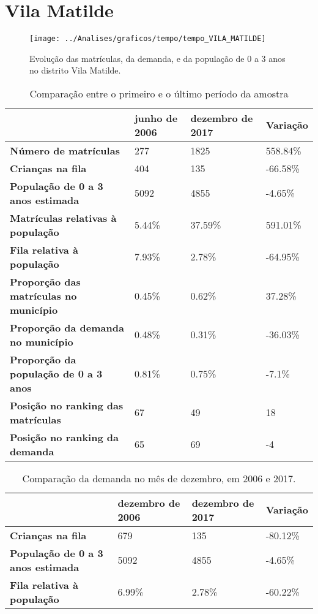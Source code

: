 \section{Vila Matilde}
\begin{figure}[H]
\centering
\texttt{[image: ../Analises/graficos/tempo/tempo\_VILA\_MATILDE]}
\caption{Evolução das matrículas, da demanda, e da população de 0 a 3 anos no distrito Vila Matilde.}
\end{figure}
\begin{table}[H]
\begin{tabular}{|l|l|l|l|}
\hline
\textbf{}                                      & \textbf{junho de 2006}       & \textbf{dezembro de 2017}    & \textbf{Variação} \\ \hline
\textbf{Número de matrículas}                  & 277 & 1825 & 558.84\% \\ \hline
\textbf{Crianças na fila}                      & 404 & 135 & -66.58\% \\ \hline
\textbf{População de 0 a 3 anos estimada}      & 5092 & 4855 & -4.65\% \\ \hline
\textbf{Matrículas relativas à população}      & 5.44\% & 37.59\% & 591.01\% \\ \hline
\textbf{Fila relativa à população}             & 7.93\% & 2.78\% & -64.95\% \\ \hline
\textbf{Proporção das matrículas no município} & 0.45\% & 0.62\% & 37.28\% \\ \hline
\textbf{Proporção da demanda no município}     & 0.48\% & 0.31\% & -36.03\% \\ \hline
\textbf{Proporção da população de 0 a 3 anos}  & 0.81\% & 0.75\% & -7.1\% \\ \hline
\textbf{Posição no ranking das matrículas}     & 67 & 49 & 18 \\ \hline
\textbf{Posição no ranking da demanda}         & 65 & 69 & -4 \\ \hline
\end{tabular}
\caption{Comparação entre o primeiro e o último período da amostra}
\end{table}
\begin{table}[H]
\begin{tabular}{|l|l|l|l|}
\hline
\textbf{}                                 & \textbf{dezembro de 2006} & \textbf{dezembro de 2017} & \textbf{Variação} \\ \hline
\textbf{Crianças na fila}                      & 679 & 135 & -80.12\% \\ \hline
\textbf{População de 0 a 3 anos estimada}      & 5092 & 4855 & -4.65\% \\ \hline
\textbf{Fila relativa à população}             & 6.99\% & 2.78\% & -60.22\% \\ \hline
\end{tabular}
\caption{Comparação da demanda no mês de dezembro, em 2006 e 2017.}
\end{table}
